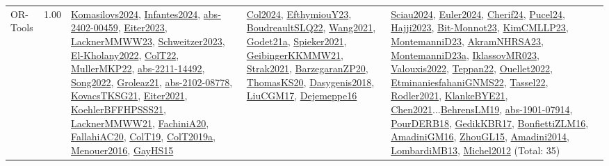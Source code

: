 {\begin{longtable}{p{3cm}r>{\raggedright\arraybackslash}p{6cm}>{\raggedright\arraybackslash}p{6cm}>{\raggedright\arraybackslash}p{8cm}}
\index{OR-Tools}\index{CPSystems!OR-Tools}OR-Tools &  1.00 & \hyperref[detail:Komasilovs2024]{Komasilovs2024}, \hyperref[detail:Infantes2024]{Infantes2024}, \hyperref[detail:abs-2402-00459]{abs-2402-00459}, \hyperref[detail:Eiter2023]{Eiter2023}, \hyperref[detail:LacknerMMWW23]{LacknerMMWW23}, \hyperref[detail:Schweitzer2023]{Schweitzer2023}, \hyperref[detail:El-Kholany2022]{El-Kholany2022}, \hyperref[detail:ColT22]{ColT22}, \hyperref[detail:MullerMKP22]{MullerMKP22}, \hyperref[detail:abs-2211-14492]{abs-2211-14492}, \hyperref[detail:Song2022]{Song2022}, \hyperref[detail:Groleaz21]{Groleaz21}, \hyperref[detail:abs-2102-08778]{abs-2102-08778}, \hyperref[detail:KovacsTKSG21]{KovacsTKSG21}, \hyperref[detail:Eiter2021]{Eiter2021}, \hyperref[detail:KoehlerBFFHPSSS21]{KoehlerBFFHPSSS21}, \hyperref[detail:LacknerMMWW21]{LacknerMMWW21}, \hyperref[detail:FachiniA20]{FachiniA20}, \hyperref[detail:FallahiAC20]{FallahiAC20}, \hyperref[detail:ColT19]{ColT19}, \hyperref[detail:ColT2019a]{ColT2019a}, \hyperref[detail:Menouer2016]{Menouer2016}, \hyperref[detail:GayHS15]{GayHS15} & \hyperref[detail:Col2024]{Col2024}, \hyperref[detail:EfthymiouY23]{EfthymiouY23}, \hyperref[detail:BoudreaultSLQ22]{BoudreaultSLQ22}, \hyperref[detail:Wang2021]{Wang2021}, \hyperref[detail:Godet21a]{Godet21a}, \hyperref[detail:Spieker2021]{Spieker2021}, \hyperref[detail:GeibingerKKMMW21]{GeibingerKKMMW21}, \hyperref[detail:Strak2021]{Strak2021}, \hyperref[detail:BarzegaranZP20]{BarzegaranZP20}, \hyperref[detail:ThomasKS20]{ThomasKS20}, \hyperref[detail:Dasygenis2018]{Dasygenis2018}, \hyperref[detail:LiuCGM17]{LiuCGM17}, \hyperref[detail:Dejemeppe16]{Dejemeppe16} & \hyperref[detail:Sciau2024]{Sciau2024}, \hyperref[detail:Euler2024]{Euler2024}, \hyperref[detail:Cherif24]{Cherif24}, \hyperref[detail:Pucel24]{Pucel24}, \hyperref[detail:Hajji2023]{Hajji2023}, \hyperref[detail:Bit-Monnot23]{Bit-Monnot23}, \hyperref[detail:KimCMLLP23]{KimCMLLP23}, \hyperref[detail:MontemanniD23]{MontemanniD23}, \hyperref[detail:AkramNHRSA23]{AkramNHRSA23}, \hyperref[detail:MontemanniD23a]{MontemanniD23a}, \hyperref[detail:IklassovMR023]{IklassovMR023}, \hyperref[detail:Valouxis2022]{Valouxis2022}, \hyperref[detail:Teppan22]{Teppan22}, \hyperref[detail:Ouellet2022]{Ouellet2022}, \hyperref[detail:EtminaniesfahaniGNMS22]{EtminaniesfahaniGNMS22}, \hyperref[detail:Tassel22]{Tassel22}, \hyperref[detail:Rodler2021]{Rodler2021}, \hyperref[detail:KlankeBYE21]{KlankeBYE21}, \hyperref[detail:Chen2021]{Chen2021}...\hyperref[detail:BehrensLM19]{BehrensLM19}, \hyperref[detail:abs-1901-07914]{abs-1901-07914}, \hyperref[detail:PourDERB18]{PourDERB18}, \hyperref[detail:GedikKBR17]{GedikKBR17}, \hyperref[detail:BonfiettiZLM16]{BonfiettiZLM16}, \hyperref[detail:AmadiniGM16]{AmadiniGM16}, \hyperref[detail:ZhouGL15]{ZhouGL15}, \hyperref[detail:Amadini2014]{Amadini2014}, \hyperref[detail:LombardiMB13]{LombardiMB13}, \hyperref[detail:Michel2012]{Michel2012} (Total: 35)\\

\end{longtable}}
